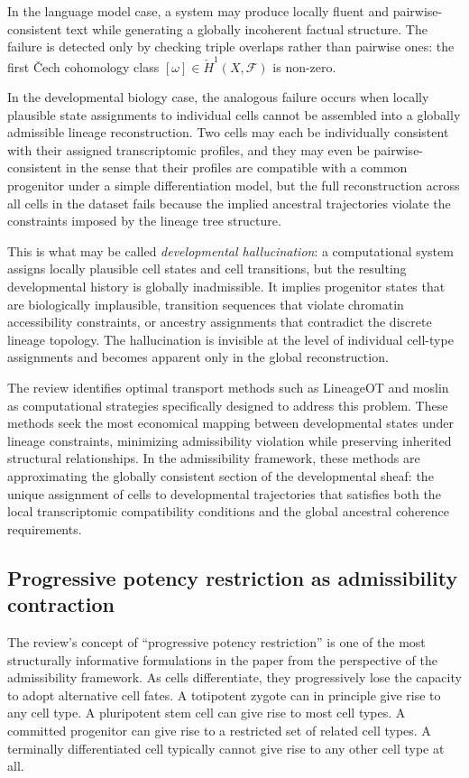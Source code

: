 \documentclass[12pt, a4paper]{article}
\theoremstyle{plain}
\theoremstyle{definition}
\theoremstyle{remark}
\begin{document}
In the language model case, a system may produce locally fluent and
pairwise-consistent text while generating a globally incoherent factual
structure.
The failure is detected only by checking triple overlaps rather than
pairwise ones: the first \v{C}ech cohomology class $[\omega] \in
\check{H}^1(X, \mathcal{F})$ is non-zero.

In the developmental biology case, the analogous failure occurs when
locally plausible state assignments to individual cells cannot be assembled
into a globally admissible lineage reconstruction.
Two cells may each be individually consistent with their assigned
transcriptomic profiles, and they may even be pairwise-consistent in the
sense that their profiles are compatible with a common progenitor under a
simple differentiation model, but the full reconstruction across all
cells in the dataset fails because the implied ancestral trajectories
violate the constraints imposed by the lineage tree structure.

This is what may be called \emph{developmental hallucination}: a
computational system assigns locally plausible cell states and cell
transitions, but the resulting developmental history is globally
inadmissible.
It implies progenitor states that are biologically implausible, transition
sequences that violate chromatin accessibility constraints, or ancestry
assignments that contradict the discrete lineage topology.
The hallucination is invisible at the level of individual cell-type
assignments and becomes apparent only in the global reconstruction.

The review identifies optimal transport methods such as LineageOT and
moslin as computational strategies specifically designed to address this
problem.
These methods seek the most economical mapping between developmental states
under lineage constraints, minimizing admissibility violation while
preserving inherited structural relationships.
In the admissibility framework, these methods are approximating the
globally consistent section of the developmental sheaf: the unique
assignment of cells to developmental trajectories that satisfies both the
local transcriptomic compatibility conditions and the global ancestral
coherence requirements.

\subsection{Progressive potency restriction as admissibility contraction}

The review's concept of ``progressive potency restriction'' is one of
the most structurally informative formulations in the paper from the
perspective of the admissibility framework.
As cells differentiate, they progressively lose the capacity to adopt
alternative cell fates.
A totipotent zygote can in principle give rise to any cell type.
A pluripotent stem cell can give rise to most cell types.
A committed progenitor can give rise to a restricted set of related cell
types.
A terminally differentiated cell typically cannot give rise to any other
cell type at all.
\end{document}
